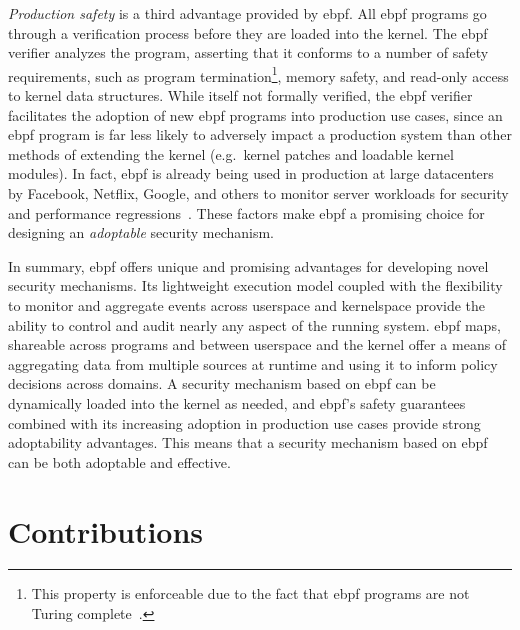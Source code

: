 \textit{Production safety} is a third advantage provided by \gls{ebpf}. All \gls{ebpf} programs go
through a verification process before they are loaded into the kernel. The \gls{ebpf} verifier
analyzes the program, asserting that it conforms to a number of safety requirements, such
as program termination\footnote{This property is enforceable due to the fact that \gls{ebpf}
programs are not Turing complete~\cite{gregg2019_bpf}.}, memory safety, and read-only
access to kernel data structures. While itself not formally verified, the \gls{ebpf} verifier
facilitates the adoption of new \gls{ebpf} programs into production use cases, since an \gls{ebpf}
program is far less likely to adversely impact a production system than other methods of
extending the kernel (e.g.\ kernel patches and loadable kernel modules). In fact, \gls{ebpf} is
already being used in production at large datacenters by Facebook, Netflix, Google, and
others to monitor server workloads for security and performance
regressions~\cite{gregg2019_bpf}. These factors make \gls{ebpf} a promising choice for
designing an \textit{adoptable} security mechanism.

In summary, \gls{ebpf} offers unique and promising advantages for developing novel security
mechanisms. Its lightweight execution model coupled with the flexibility to monitor and
aggregate events across userspace and kernelspace provide the ability to control and audit
nearly any aspect of the running system. \gls{ebpf} maps, shareable across programs and between
userspace and the kernel offer a means of aggregating data from multiple sources at
runtime and using it to inform policy decisions across domains. A security mechanism based
on \gls{ebpf} can be dynamically loaded into the kernel as needed, and \gls{ebpf}'s safety guarantees
combined with its increasing adoption in production use cases provide strong adoptability
advantages. This means that a security mechanism based on \gls{ebpf} can be both adoptable and
effective.


\section{Contributions}%
\label{s:contributions}

